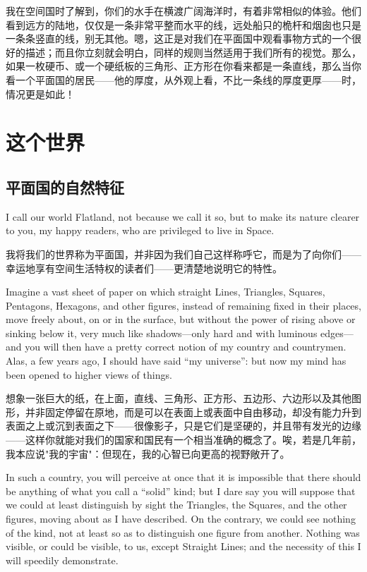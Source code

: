 \documentclass[12pt,UTF8]{ctexbook}
\begin{document}
我在空间国时了解到，你们的水手在横渡广阔海洋时，有着非常相似的体验。他们看到远方的陆地，仅仅是一条非常平整而水平的线，远处船只的桅杆和烟囱也只是一条条竖直的线，别无其他。嗯，这正是对我们在平面国中观看事物方式的一个很好的描述；而且你立刻就会明白，同样的规则当然适用于我们所有的视觉。那么，如果一枚硬币、或一个硬纸板的三角形、正方形在你看来都是一条直线，那么当你看一个平面国的居民——他的厚度，从外观上看，不比一条线的厚度更厚——时，情况更是如此！

\mainmatter

\part{这个世界}

\chapter{平面国的自然特征}

I call our world Flatland, not because we call it so, but to make its nature clearer to you, my happy readers, who are privileged to live in Space.

我将我们的世界称为平面国，并非因为我们自己这样称呼它，而是为了向你们——幸运地享有空间生活特权的读者们——更清楚地说明它的特性。

Imagine a vast sheet of paper on which straight Lines, Triangles, Squares, Pentagons, Hexagons, and other figures, instead of remaining fixed in their places, move freely about, on or in the surface, but without the power of rising above or sinking below it, very much like shadows---only hard and with luminous edges---and you will then have a pretty correct notion of my country and countrymen. Alas, a few years ago, I should have said ``my universe'': but now my mind has been opened to higher views of things.

想象一张巨大的纸，在上面，直线、三角形、正方形、五边形、六边形以及其他图形，并非固定停留在原地，而是可以在表面上或表面中自由移动，却没有能力升到表面之上或沉到表面之下——很像影子，只是它们是坚硬的，并且带有发光的边缘——这样你就能对我们的国家和国民有一个相当准确的概念了。唉，若是几年前，我本应说"我的宇宙"：但现在，我的心智已向更高的视野敞开了。

In such a country, you will perceive at once that it is impossible that there should be anything of what you call a ``solid'' kind; but I dare say you will suppose that we could at least distinguish by sight the Triangles, the Squares, and the other figures, moving about as I have described. On the contrary, we could see nothing of the kind, not at least so as to distinguish one figure from another. Nothing was visible, or could be visible, to us, except Straight Lines; and the necessity of this I will speedily demonstrate.
\end{document}
